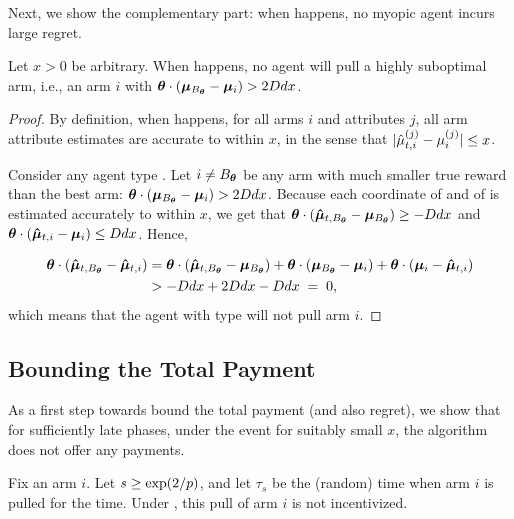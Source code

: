 Next, we show the complementary part:
when  happens, no myopic agent incurs large regret.

\begin{lemma} \label{lem:right-choice}
Let $x > 0$ be arbitrary.
When  happens,
no agent \AgV will pull a highly suboptimal arm, i.e., an arm $i$ with 
$\bm{\theta} \cdot (\bm{\mu}_{B_{\bm{\theta}}} - \bm{\mu}_{i}) > 2D d x$.
\end{lemma}

\begin{proof}
By definition, when  happens,
for all arms $i$ and attributes $j$,
all arm attribute estimates are accurate to within $x$,
in the sense that
$|\hat{\mu}_{t,i}^{(j)} - \mu_{i}^{(j)}| \leq x$.

Consider any agent type \AgV.
Let $i \neq B_{\bm{\theta}}$ be any arm
with much smaller true reward than the best arm:
$\bm{\theta} \cdot (\bm{\mu}_{B_{\bm{\theta}}} - \bm{\mu}_{i}) > 2D d x$.
Because each coordinate of  and of
 is estimated accurately to within $x$, 
we get that 
$\bm{\theta} \cdot (\bm{\hat{\mu}}_{t,B_{\bm{\theta}}} - \bm{\mu}_{B_{\bm{\theta}}})
\geq - D d x$
and
$\bm{\theta} \cdot (\bm{\hat{\mu}}_{t,i} - \bm{\mu}_{i}) \leq D d x$.
Hence, 

\begin{align}
\bm{\theta} \cdot (\bm{\hat{\mu}}_{t,B_{\bm{\theta}}} - \bm{\hat{\mu}}_{t,i})
& =
\bm{\theta} \cdot (\bm{\hat{\mu}}_{t,B_{\bm{\theta}}} - \bm{\mu}_{B_{\bm{\theta}}})
+ \bm{\theta} \cdot (\bm{\mu}_{B_{\bm{\theta}}} - \bm{\mu}_{i})
+ \bm{\theta} \cdot (\bm{\mu}_{i} - \bm{\hat{\mu}}_{t,i}) \nonumber\\
& > -D d x + 2 D d x - D d x
\; = \; 0, \label{equ:choice}
\end{align}
which means that the agent with type \AgV will not pull arm $i$.
\end{proof}

\subsection{Bounding the Total Payment}

As a first step towards bound the total payment (and also regret),
we show that for sufficiently late phases,
under the event  for suitably small $x$,
the algorithm does not offer any payments.

\begin{lemma} \label{lem:no-incentives}
Fix an arm $i$.
Let $s \geq \exp(2/p)$, and let $\tau_s$ be the (random)
time when arm $i$ is pulled for the  time.
Under ,
this pull of arm $i$ is not incentivized.
\end{lemma}

